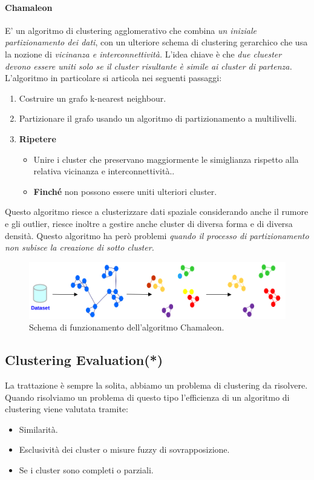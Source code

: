 \paragraph{Chamaleon} E' un algoritmo di clustering agglomerativo che combina \textit{un iniziale partizionamento dei dati}, con un ulteriore schema di clustering gerarchico che usa la nozione di \textit{vicinanza e interconnettività.} L'idea chiave è che \textit{due cluester devono essere uniti solo se il cluster risultante è simile ai cluster di partenza.}
L'algoritmo in particolare si articola nei seguenti passaggi:
\begin{enumerate}
	\item Costruire un grafo k-nearest neighbour.
	\item Partizionare il grafo usando un algoritmo di partizionamento a multilivelli.
	\item \textbf{Ripetere}
	\begin{itemize}
		\item Unire i cluster che preservano maggiormente le simiglianza rispetto alla relativa vicinanza e interconnettività..
		\item \textbf{Finché} non possono essere uniti ulteriori cluster.
	\end{itemize}
	
\end{enumerate}

Questo algoritmo riesce a clusterizzare dati spaziale considerando anche il rumore e gli outlier, riesce inoltre a gestire anche cluster di diversa forma e di diversa densità. Questo algoritmo ha però problemi \textit{quando il processo di partizionamento non subisce la creazione di sotto cluster.}
\begin{figure}[H]
	\centering
	\includegraphics[height=0.18 \linewidth]{clustering/pict/chamaleon.png}
	\caption{Schema di funzionamento dell'algoritmo Chamaleon.}
\end{figure}

\subsection{Clustering Evaluation(*)}
La trattazione è sempre la solita, abbiamo un problema di clustering da risolvere. Quando risolviamo un problema di questo tipo l'efficienza di un algoritmo di clustering viene valutata tramite:
\begin{itemize}
	\item Similarità.
	\item Esclusività dei cluster o misure fuzzy di sovrapposizione.
	\item Se i cluster sono completi o parziali.
\end{itemize}

